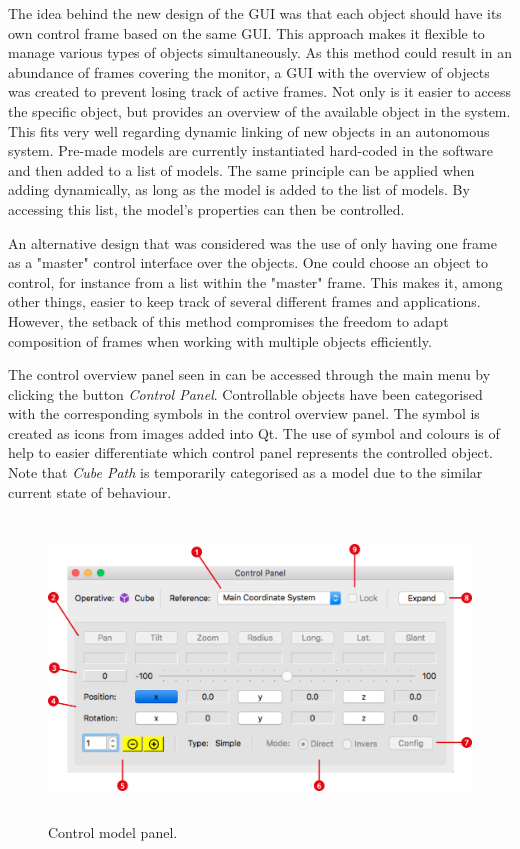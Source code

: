 The idea behind the new design of the GUI was that each object should have its own control frame based on the same GUI. This approach makes it flexible to manage various types of objects simultaneously. As this method could result in an abundance of frames covering the monitor, a GUI with the overview of objects was created to prevent losing track of active frames. Not only is it easier to access the specific object, but provides an overview of the available object in the system. This fits very well regarding dynamic linking of new objects in an autonomous system. Pre-made models are currently instantiated hard-coded in the software and then added to a list of models. The same principle can be applied when adding dynamically, as long as the model is added to the list of models. By accessing this list, the model's properties can then be controlled. 

An alternative design that was considered was the use of only having one frame as a "master" control interface over the objects. One could choose an object to control, for instance from a list within the "master" frame. This makes it, among other things, easier to keep track of several different frames and applications. However, the setback of this method compromises the freedom to adapt composition of frames when working with multiple objects efficiently. 

The control overview panel seen in  can be accessed through the main menu by clicking the button \textit{Control Panel}. Controllable objects have been categorised with the corresponding symbols in the control overview panel. The symbol is created as icons from images added into Qt. The use of symbol and colours is of help to easier differentiate which control panel represents the controlled object. Note that \textit{Cube Path} is temporarily categorised as a model due to the similar current state of behaviour.

\begin{figure}[ht]
    \centering
    \includegraphics[height=8cm]{images/general_control_nr.png}
    \caption[Control model panel]{Control model panel.}
    \label{fig:ctrgeneral}
\end{figure}


